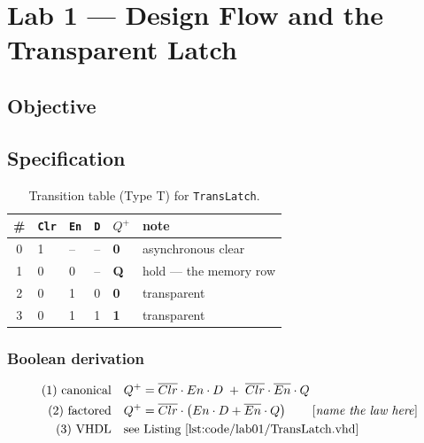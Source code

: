 %

\chapter{Lab 1 --- Design Flow and the Transparent Latch}

\section{Objective}

\section{Specification}

\begin{table}[htbp]
\centering
\caption{Transition table (Type T) for \texttt{TransLatch}.}
\label{tab:lab01-truth}
\begin{tabular}{clll||ll}
\toprule
\# & \texttt{Clr} & \texttt{En} & \texttt{D} & $Q^{+}$ & note \\
\midrule
0 & 1 & -- & -- & \textbf{0} & asynchronous clear \\
1 & 0 & 0 & -- & \textbf{Q} & hold --- the memory row \\
2 & 0 & 1 & 0 & \textbf{0} & transparent \\
3 & 0 & 1 & 1 & \textbf{1} & transparent \\
\bottomrule
\end{tabular}
\end{table}

\subsection*{Boolean derivation}

\begin{align*}
\text{(1) canonical} \quad & Q^{+} = \overline{Clr}\cdot En \cdot D \;+\; \overline{Clr}\cdot\overline{En}\cdot Q \\
\text{(2) factored}  \quad & Q^{+} = \overline{Clr}\cdot\left( En\cdot D + \overline{En}\cdot Q \right)
   \qquad \text{[\emph{name the law here}]} \\
\text{(3) VHDL}      \quad & \text{see Listing~\ref{lst:code/lab01/TransLatch.vhd}}
\end{align*}

